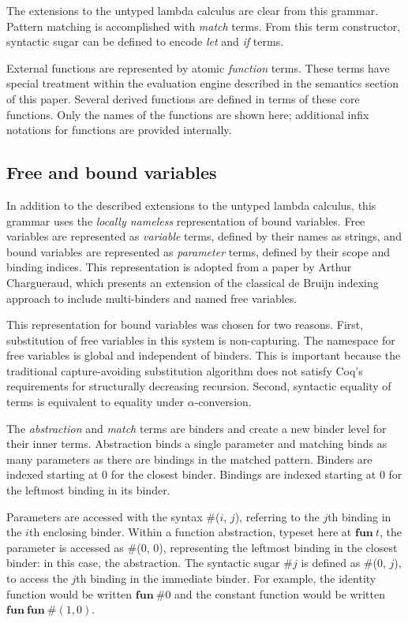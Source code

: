 \documentclass[12pt]{article}
\def\tfun{\mathbf{fun}}
\newcommand{\TFun}[1]{\tfun\ #1}
\begin{document}
The extensions to the untyped lambda calculus are clear from this
grammar.  Pattern matching is accomplished with \emph{match} terms.
From this term constructor, syntactic sugar can be defined to encode
\emph{let} and \emph{if} terms.

External functions are represented by atomic \emph{function} terms.
These terms have special treatment within the evaluation engine
described in the semantics section of this paper.  Several derived
functions are defined in terms of these core functions.  Only the names
of the functions are shown here; additional infix notations for
functions are provided internally.

\subsection{Free and bound variables}

In addition to the described extensions to the untyped lambda calculus,
this grammar uses the \emph{locally nameless} representation of bound
variables.  Free variables are represented as \emph{variable} terms,
defined by their names as strings, and bound variables are represented
as \emph{parameter} terms, defined by their scope and binding indices.
This representation is adopted from a paper by Arthur Chargueraud, which
presents an extension of the classical de Bruijn indexing approach to
include multi-binders and named free variables.

This representation for bound variables was chosen for two reasons.
First, substitution of free variables in this system is non-capturing.
The namespace for free variables is global and independent of binders.
This is important because the traditional capture-avoiding substitution
algorithm does not satisfy Coq's requirements for structurally
decreasing recursion.  Second, syntactic equality of terms is equivalent
to equality under $\alpha$-conversion.

The \emph{abstraction} and \emph{match} terms are binders and create a
new binder level for their inner terms.  Abstraction binds a single
parameter and matching binds as many parameters as there are bindings in
the matched pattern.  Binders are indexed starting at 0 for the closest
binder. Bindings are indexed starting at 0 for the leftmost binding in
its binder.

Parameters are accessed with the syntax \#($i$, $j$), referring to the
$j$th binding in the $i$th enclosing binder.  Within a function
abstraction, typeset here at $\TFun{t}$, the parameter is accessed as
\#(0, 0), representing the leftmost binding in the closest binder: in
this case, the abstraction. The syntactic sugar \#$j$ is defined as
\#(0, $j$), to access the $j$th binding in the immediate binder.  For
example, the identity function would be written $\TFun{\#0}$ and the
constant function would be written $\TFun{\TFun{\#(1, 0)}}$.
\end{document}
